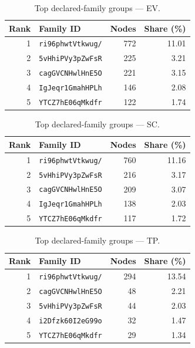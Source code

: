 \documentclass[conference]{IEEEtran}
\begin{document}
\begin{table}[H]
\caption{Top declared-family groups --- EV.}
\begin{center}\small
\begin{tabular}{|r|l|r|r|}
\hline
\textbf{Rank} & \textbf{Family ID} & \textbf{Nodes} & \textbf{Share (\%)} \\ \hline
1 & \texttt{ri96phwtVtkwug/} & 772 & 11.01 \\ \hline
2 & \texttt{5vHhiPVy3pZwFsR} & 225 & 3.21 \\ \hline
3 & \texttt{cagGVCNHwlHnE5O} & 221 & 3.15 \\ \hline
4 & \texttt{IgJeqr1GmahHPLh} & 146 & 2.08 \\ \hline
5 & \texttt{YTCZ7hE06qMkdfr} & 122 & 1.74 \\ \hline
\end{tabular}
\label{tab:famid_count_ephemeral_variable}
\end{center}\end{table}
 
\begin{table}[H]
\caption{Top declared-family groups --- SC.}
\begin{center}\small
\begin{tabular}{|r|l|r|r|}
\hline
\textbf{Rank} & \textbf{Family ID} & \textbf{Nodes} & \textbf{Share (\%)} \\ \hline
1 & \texttt{ri96phwtVtkwug/} & 760 & 11.16 \\ \hline
2 & \texttt{5vHhiPVy3pZwFsR} & 216 & 3.17 \\ \hline
3 & \texttt{cagGVCNHwlHnE5O} & 209 & 3.07 \\ \hline
4 & \texttt{IgJeqr1GmahHPLh} & 138 & 2.03 \\ \hline
5 & \texttt{YTCZ7hE06qMkdfr} & 117 & 1.72 \\ \hline
\end{tabular}
\label{tab:famid_count_static_control}
\end{center}\end{table}
 
\begin{table}[H]
\caption{Top declared-family groups --- TP.}
\begin{center}\small
\begin{tabular}{|r|l|r|r|}
\hline
\textbf{Rank} & \textbf{Family ID} & \textbf{Nodes} & \textbf{Share (\%)} \\ \hline
1 & \texttt{ri96phwtVtkwug/} & 294 & 13.54 \\ \hline
2 & \texttt{cagGVCNHwlHnE5O} & 48 & 2.21 \\ \hline
3 & \texttt{5vHhiPVy3pZwFsR} & 44 & 2.03 \\ \hline
4 & \texttt{i2Dfzk60I2eG99o} & 32 & 1.47 \\ \hline
5 & \texttt{YTCZ7hE06qMkdfr} & 29 & 1.34 \\ \hline
\end{tabular}
\label{tab:famid_count_third_party_probe}
\end{center}\end{table}
 
\end{document}
